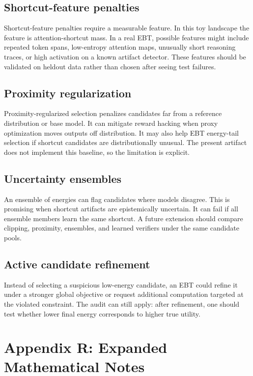 \documentclass{article}
\begin{document}
\subsection{Shortcut-feature penalties}

Shortcut-feature penalties require a measurable feature. In this toy landscape
the feature is attention-shortcut mass. In a real EBT, possible features might
include repeated token spans, low-entropy attention maps, unusually short
reasoning traces, or high activation on a known artifact detector. These
features should be validated on heldout data rather than chosen after seeing
test failures.

\subsection{Proximity regularization}

Proximity-regularized selection penalizes candidates far from a reference
distribution or base model. It can mitigate reward hacking when proxy
optimization moves outputs off distribution. It may also help EBT energy-tail
selection if shortcut candidates are distributionally unusual. The present
artifact does not implement this baseline, so the limitation is explicit.

\subsection{Uncertainty ensembles}

An ensemble of energies can flag candidates where models disagree. This is
promising when shortcut artifacts are epistemically uncertain. It can fail if
all ensemble members learn the same shortcut. A future extension should compare
clipping, proximity, ensembles, and learned verifiers under the same candidate
pools.

\subsection{Active candidate refinement}

Instead of selecting a suspicious low-energy candidate, an EBT could refine it
under a stronger global objective or request additional computation targeted at
the violated constraint. The audit can still apply: after refinement, one
should test whether lower final energy corresponds to higher true utility.

\section{Appendix R: Expanded Mathematical Notes}
\end{document}
